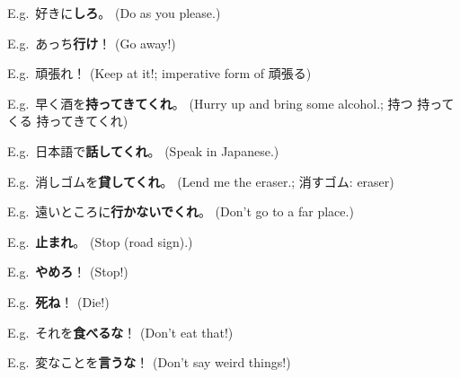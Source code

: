 \documentclass[../nihongo-gakushuu-kyouzai.tex]{subfiles}
\begin{document}

E.g.\ 好きに\textbf{しろ}。 (Do as you please.)

E.g.\ あっち\textbf{行け}！ (Go away!)

E.g.\ 頑張れ！ (Keep at it!; imperative form of 頑張る)

E.g.\ 早く酒を\textbf{持ってきてくれ}。 (Hurry up and bring some alcohol.; 持つ \to{} 持ってくる \to{} 持ってきてくれ)

E.g.\ 日本語で\textbf{話してくれ}。 (Speak in Japanese.)

E.g.\ 消しゴムを\textbf{貸してくれ}。 (Lend me the eraser.; 消すゴム: eraser)

E.g.\ 遠いところに\textbf{行かないでくれ}。 (Don't go to a far place.)

E.g.\ \textbf{止まれ}。 (Stop (road sign).)

E.g.\ \textbf{やめろ}！ (Stop!)

E.g.\ \textbf{死ね}！ (Die!)


E.g.\ それを\textbf{食べるな}！ (Don't eat that!)

E.g.\ 変なことを\textbf{言うな}！ (Don't say weird things!)
\end{document}
